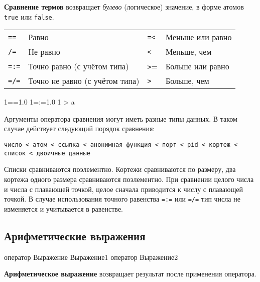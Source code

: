\textbf{Сравнение термов} возвращает \emph{булево} (логическое) значение, в форме
атомов \texttt{true} или \texttt{false}.

\begin{center}
\begin{tabular}{|>{\raggedright}p{40pt}|>{\raggedright}p{185pt}|>{\raggedright}p{26pt}|>{\raggedright}p{135pt}|}
\hline
\multicolumn{4}{|p{297pt}|}{Операторы сравнения}\tabularnewline
\hline
\texttt{==} & Равно & \texttt{=<} & Меньше или равно \tabularnewline
\hline
\texttt{/=} & Не равно & \texttt{<} & Меньше, чем \tabularnewline
\hline
\texttt{=:=} & Точно равно (с учётом типа) & \texttt{>}= & Больше или равно \tabularnewline
\hline
\texttt{=/=} & Точно не равно (с учётом типа) & \texttt{>} & Больше, чем \tabularnewline
\hline
\end{tabular}
\end{center}

\begin{erlang}
1==1.0              %
1=:=1.0             %
1 > a               %
\end{erlang}

Аргументы оператора сравнения могут иметь разные типы данных. В таком случае 
действует следующий порядок сравнения:

\texttt{число < атом < ссылка < анонимная функция < порт < pid < кортеж < список < 
	двоичные данные}

Списки сравниваются поэлементно. Кортежи сравниваются по размеру, два кортежа 
одного размера сравниваются поэлементно. При сравнении целого числа и числа с 
плавающей точкой, целое сначала приводится к числу с плавающей точкой. В случае 
использования точного равенства \texttt{=:=} или \texttt{=/=} тип числа не 
изменяется и учитывается в равенстве.


\subsection{Арифметические выражения}

\begin{erlangru}
оператор Выражение
Выражение1 оператор Выражение2
\end{erlangru}

\textbf{Арифметическое выражение} возвращает результат после применения оператора.

